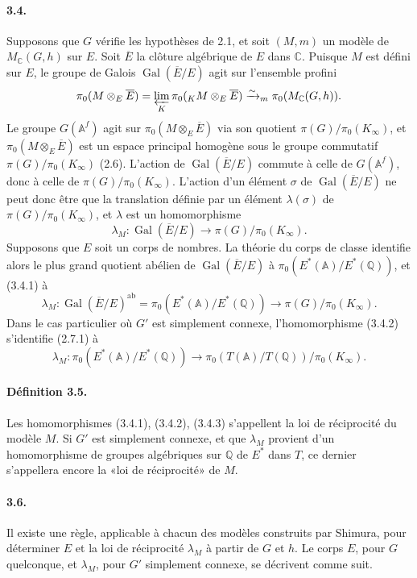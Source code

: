 \documentclass[10pt]{article}
\newcommand{\A}{\mathbb A}
\newcommand{\Af}{\mathbb A^f}
\newcommand{\C}{\mathbb C}
\newcommand{\Q}{\mathbb Q}
\newcommand{\Gal}{\operatorname{Gal}}
\newcommand{\limproj}{\varprojlim}
\newcommand{\MC}{M_{\C}}
\newcommand{\ab}{\mathrm{ab}}
\begin{document}
\paragraph{3.4.} Supposons que $G$ vérifie les hypothèses de 2.1, et soit $(M,m)$ un modèle de $\MC(G,h)$ sur $E$. Soit $\overline E$ la clôture algébrique de $E$ dans $\C$. Puisque $M$ est défini sur $E$, le groupe de Galois $\Gal(\overline E/E)$ agit sur l'ensemble profini
\[
\pi_0(M\otimes_E\overline E)=\limproj_K\pi_0({}_K M\otimes_E\overline E)\xrightarrow{\sim}_{m}\pi_0(\MC(G,h)).
\]
Le groupe $G(\Af)$ agit sur $\pi_0(M\otimes_E\overline E)$ via son quotient $\pi(G)/\pi_0(K_\infty)$, et $\pi_0(M\otimes_E\overline E)$ est un espace principal homogène sous le groupe commutatif $\pi(G)/\pi_0(K_\infty)$ (2.6). L'action de $\Gal(\overline E/E)$ commute à celle de $G(\Af)$, donc à celle de $\pi(G)/\pi_0(K_\infty)$. L'action d'un élément $\sigma$ de $\Gal(\overline E/E)$ ne peut donc être que la translation définie par un élément $\lambda(\sigma)$ de $\pi(G)/\pi_0(K_\infty)$, et $\lambda$ est un homomorphisme
\[
\lambda_M:\Gal(\overline E/E)\longrightarrow \pi(G)/\pi_0(K_\infty).\tag{3.4.1}
\]
Supposons que $E$ soit un corps de nombres. La théorie du corps de classe identifie alors le plus grand quotient abélien de $\Gal(\overline E/E)$ à $\pi_0(E^*(\A)/E^*(\Q))$, et (3.4.1) à
\[
\lambda_M:\Gal(\overline E/E)^{\ab}=\pi_0(E^*(\A)/E^*(\Q))\longrightarrow\pi(G)/\pi_0(K_\infty).\tag{3.4.2}
\]
Dans le cas particulier où $G'$ est simplement connexe, l'homomorphisme (3.4.2) s'identifie (2.7.1) à
\[
\lambda_M:\pi_0(E^*(\A)/E^*(\Q))\longrightarrow\pi_0(T(\A)/T(\Q))/\pi_0(K_\infty).\tag{3.4.3}
\]

\paragraph{Définition 3.5.} Les homomorphismes (3.4.1), (3.4.2), (3.4.3) s'appellent la loi de réciprocité du modèle $M$. Si $G'$ est simplement connexe, et que $\lambda_M$ provient d'un homomorphisme de groupes algébriques sur $\Q$ de $E^*$ dans $T$, ce dernier s'appellera encore la «loi de réciprocité» de $M$.

\paragraph{3.6.} Il existe une règle, applicable à chacun des modèles construits par Shimura, pour déterminer $E$ et la loi de réciprocité $\lambda_M$ à partir de $G$ et $h$. Le corps $E$, pour $G$ quelconque, et $\lambda_M$, pour $G'$ simplement connexe, se décrivent comme suit.
\end{document}
